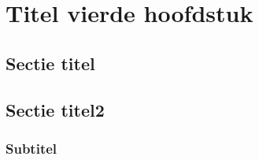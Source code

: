 \chapter{Titel vierde hoofdstuk}

\lipsum[20]

\lipsum[21-22]

\section{Sectie titel}

\lipsum[32-34]

\section{Sectie titel2}

\lipsum[6-8]


\subsection{Subtitel}

\lipsum[31]
